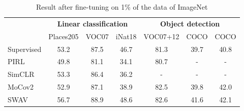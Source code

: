 \begin{table}[H]
	\centering
	\begin{tabular}{l|ccc||ccc|}
		\cline{2-7}
		\multicolumn{1}{c|}{\textbf{}} & \multicolumn{3}{c||}{\textbf{Linear classification}} & \multicolumn{3}{c|}{\textbf{Object detection}} \\ \cline{2-7} 
		& \multicolumn{1}{l|}{Places205} & \multicolumn{1}{l|}{VOC07} & \multicolumn{1}{l||}{iNat18} & \multicolumn{1}{l|}{VOC07+12} & \multicolumn{1}{l|}{COCO} & \multicolumn{1}{l|}{COCO} \\ \hline
		\multicolumn{1}{|l|}{Supervised} & \multicolumn{1}{c|}{53.2} & \multicolumn{1}{c|}{87.5} & 46.7 & \multicolumn{1}{c|}{81.3} & \multicolumn{1}{c|}{39.7} & 40.8 \\ \hline
		\multicolumn{1}{|l|}{PIRL} & \multicolumn{1}{c|}{49.8} & \multicolumn{1}{c|}{81.1} & 34.1 & \multicolumn{1}{c|}{80.7} & \multicolumn{1}{c|}{-} & - \\ \hline
		\multicolumn{1}{|l|}{SimCLR} & \multicolumn{1}{c|}{53.3} & \multicolumn{1}{c|}{86.4} & 36.2 & \multicolumn{1}{c|}{-} & \multicolumn{1}{c|}{-} & - \\ \hline
		\multicolumn{1}{|l|}{MoCov2} & \multicolumn{1}{c|}{52.9} & \multicolumn{1}{c|}{87.1} & 38.9 & \multicolumn{1}{c|}{82.5} & \multicolumn{1}{c|}{39.8} & 42.0 \\ \hline
		\multicolumn{1}{|l|}{SWAV} & \multicolumn{1}{c|}{56.7} & \multicolumn{1}{c|}{88.9} & 48.6 & \multicolumn{1}{c|}{82.6} & \multicolumn{1}{c|}{41.6} & 42.1 \\ \hline
	\end{tabular}
	\caption{Result after fine-tuning on 1\% of the data of ImageNet}
	\label{tab:object-detection-swav}
\end{table}

